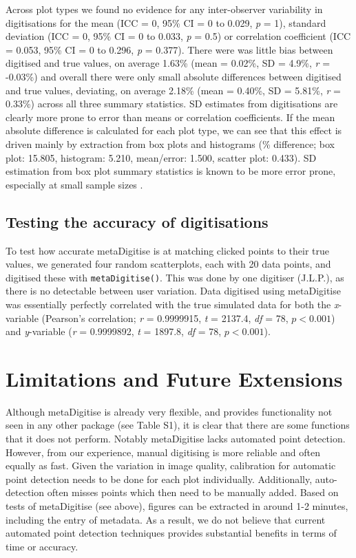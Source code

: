 \documentclass[12pt]{article}
\newcommand{\fct}[1]{\texttt{#1()}}
\newcommand{\pkg}[1]{{\fontseries{b}\selectfont #1}}
\begin{document}
Across plot types we found no evidence for any inter-observer variability in digitisations for the mean (ICC = 0, 95\% CI = 0 to 0.029, \textit{p} = 1), standard deviation (ICC = 0, 95\% CI = 0 to 0.033, \textit{p} = 0.5) or correlation coefficient (ICC = 0.053, 95\% CI = 0 to 0.296, \textit{p} = 0.377). There were was little bias between digitised and true values, on average 1.63\% (mean = 0.02\%, SD = 4.9\%, \textit{r} = -0.03\%) and overall there were only small absolute differences between digitised and true values, deviating, on average 2.18\% (mean = 0.40\%, SD = 5.81\%, \textit{r} = 0.33\%) across all three summary statistics. SD estimates from digitisations are clearly more prone to error than means or correlation coefficients. If the mean absolute difference is calculated for each plot type, we can see that this effect is driven mainly by extraction from box plots and histograms (\% difference; box plot: 15.805, histogram: 5.210, mean/error: 1.500, scatter plot: 0.433). SD estimation from box plot summary statistics is known to be more error prone, especially at small sample sizes \citep{Wan2014}.

\subsection{Testing the accuracy of digitisations}
To test how accurate \pkg{metaDigitise} is at matching clicked points to their true values, we generated four random scatterplots, each with 20 data points, and digitised these with \fct{metaDigitise}. This was done by one digitiser (J.L.P.), as there is no detectable between user variation. Data digitised using \pkg{metaDigitise} was essentially perfectly correlated with the true simulated data for both the \textit{x}-variable (Pearson's correlation; \textit{r} = 0.9999915, \textit{t} = 2137.4, \textit{df} = 78, $p < 0.001$) and \textit{y}-variable (\textit{r} = 0.9999892, \textit{t} = 1897.8, \textit{df} = 78, $p < 0.001$).






\section{Limitations and Future Extensions}

Although \pkg{metaDigitise} is already very flexible, and provides functionality not seen in any other package (see Table S1), it is clear that there are some functions that it does not perform. Notably \pkg{metaDigitise} lacks automated point detection. However, from our experience, manual digitising is more reliable and often equally as fast. Given the variation in image quality, calibration for automatic point detection needs to be done for each plot individually. Additionally, auto-detection often misses points which then need to be manually added. Based on tests of \pkg{metaDigitise} (see above), figures can be extracted in around 1-2 minutes, including the entry of metadata. As a result, we do not believe that current automated point detection techniques provides substantial benefits in terms of time or accuracy.
\end{document}
